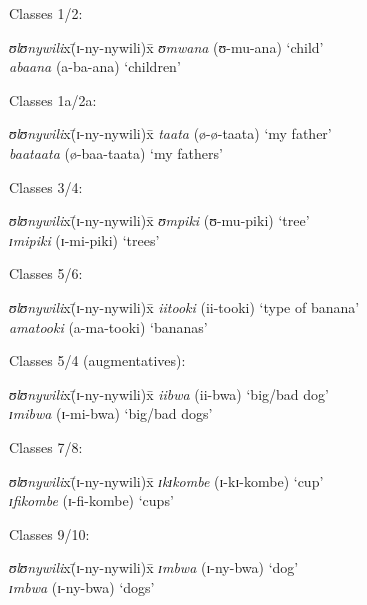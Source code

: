 \newpage 
\begin{exe}
\ex \label{exNCLpairings}
\begin{xlist}
\ex Classes 1/2:
\begin{tabbing}
\textit{ʊlʊnywili}x\=(\degree ɪ-ny-nywili)x\=\kill %
\textit{ʊmwana} \> (\degree ʊ-mu-ana) \> \lq child'\\
\textit{abaana} \> (\degree a-ba-ana) \> \lq children'
\end{tabbing}
\ex Classes 1a/2a:
\begin{tabbing}
\textit{ʊlʊnywili}x\=(\degree ɪ-ny-nywili)x\=\kill %
\textit{taata} \> (\degree ø-ø-taata) \> \lq my father'\\
\textit{baataata} \> (\degree ø-baa-taata) \> \lq my fathers'
\end{tabbing}
\ex Classes 3/4:
\begin{tabbing}
\textit{ʊlʊnywili}x\=(\degree ɪ-ny-nywili)x\=\kill %
\textit{ʊmpiki} \> (\degree ʊ-mu-piki) \> \lq tree'\\
\textit{ɪmipiki} \> (\degree ɪ-mi-piki) \> \lq trees'
\end{tabbing}
\ex Classes 5/6:
\begin{tabbing}
\textit{ʊlʊnywili}x\=(\degree ɪ-ny-nywili)x\=\kill %
\textit{iitooki} \> (\degree ii-tooki) \> \lq type of banana'\\
\textit{amatooki} \> (\degree a-ma-tooki) \> \lq bananas'
\end{tabbing}
\ex Classes 5/4 (augmentatives):
\begin{tabbing}
\textit{ʊlʊnywili}x\=(\degree ɪ-ny-nywili)x\=\kill %
\textit{iibwa} \> (\degree ii-bwa) \> \lq big/bad dog'\\
\textit{ɪmibwa} \> (\degree ɪ-mi-bwa) \> \lq big/bad dogs'
\end{tabbing}
\ex Classes 7/8:
\begin{tabbing}
\textit{ʊlʊnywili}x\=(\degree ɪ-ny-nywili)x\=\kill %
\textit{ɪkɪkombe} \> (\degree ɪ-kɪ-kombe) \> \lq cup'\\
\textit{ɪfikombe} \> (\degree ɪ-fi-kombe) \> \lq cups'
\end{tabbing}
\ex Classes 9/10:
\begin{tabbing}
\textit{ʊlʊnywili}x\=(\degree ɪ-ny-nywili)x\=\kill %
\textit{ɪmbwa} \> (\degree ɪ-ny-bwa) \> \lq dog'\\
\textit{ɪmbwa} \> (\degree ɪ-ny-bwa) \> \lq dogs'
\end{tabbing}

\end{xlist}
\end{exe}
